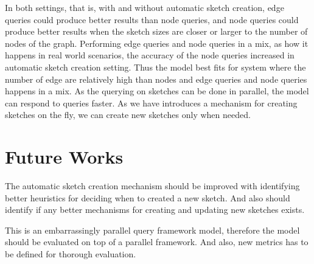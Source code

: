 \documentclass[conference]{IEEEtran}
\begin{document}
In both settings, that is, with and without automatic sketch creation, edge queries could produce better results than node queries, and node queries could produce better results when the sketch sizes are closer or larger to the number of nodes of the graph. Performing edge queries and node queries in a mix, as how it happens in real world scenarios, the accuracy of the node queries  increased in automatic sketch creation setting. Thus the model best fits for system where the number of edge are relatively high than nodes and edge queries and node queries happens in a mix. As the querying on sketches can be done in parallel, the model can respond to queries faster. As we have introduces a mechanism for creating sketches on the fly, we can create new sketches only when needed.

\section{Future Works}

The automatic sketch creation mechanism should be improved with identifying better heuristics for deciding when to created a new sketch. And also should identify if any better mechanisms for creating  and  updating  new sketches exists.  

This is an embarrassingly parallel query framework model, therefore the model should be evaluated on top of a parallel framework. And also, new metrics has to be defined for thorough evaluation.




\newpage

\end{document}
